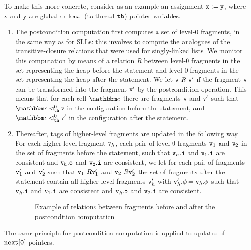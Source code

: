 To make this more concrete, consider as an example an assignment
${\tt x := y}$, where $\mathtt{x}$ and $\mathtt{y}$ are global or local
(to thread ${\tt th}$) pointer variables.
\begin{enumerate}
  \item
The postcondition computation first computes a set of level-$0$ fragments,
in the same way as for SLLs: this involves to compute
the analogues of the transitive-closure relations that were used
for singly-linked lists. We monitor this computation by means of a relation
$R$ between level-$0$ fragments  in the set representing the heap before the
statement and level-$0$ fragments in the set representing the heap after the
statement. We let $\mathtt{v} \ R \ \mathtt{v}'$ if the fragment $\mathtt{v}$ can be
transformed into the fragment $\mathtt{v}'$ by the postcondition operation.
This means that for each cell $\cell$ there are fragments $\mathtt{v}$ and $\mathtt{v}'$
such that $\cell \satslfrag{\thread}{0} \frag$ in the configuration before
the statement, and $\cell \satslfrag{\thread}{0} \frag'$ in the configuration
after the statement.
\item
  Thereafter, tags of higher-level fragments are updated in the following way
  For each higher-level fragment $\mathtt{v}_h$, each pair of
  level-$0$-fragments $\mathtt{v}_1$ and $\mathtt{v}_2$ in the set of fragments
  before the statement, such that
  $\mathtt{v}_h.\mathtt{i}$ and $\mathtt{v}_1.\mathtt{i}$ are consistent and
  $\mathtt{v}_h.\mathtt{o}$ and $\mathtt{v}_2.\mathtt{i}$ are consistent, we let for
  each pair of fragments $\mathtt{v}_1'$ and $\mathtt{v}_2'$ such that
  $\mathtt{v}_1 \ R \mathtt{v}_1'$ and $\mathtt{v}_2 \ R \mathtt{v}_2'$ the set of fragments
  after the statement contain all higher-level fragments
  $\mathtt{v}_h'$ with $\mathtt{v}_h'.\phi = \mathtt{v}_h.\phi$ such that
  $\mathtt{v}_h.\mathtt{i}$ and $\mathtt{v}_1.\mathtt{i}$ are consistent and
  $\mathtt{v}_h.\mathtt{o}$ and $\mathtt{v}_2.\mathtt{i}$ are consistent.
 \begin{figure}

 
  	\caption{Example of relations between fragments before and after the postcondition computation}
  	\label{skiprels}
 \end{figure}
\end{enumerate}
The same principle for postcondition computation is applied to updates of
$\tt next[0]$-pointers.

